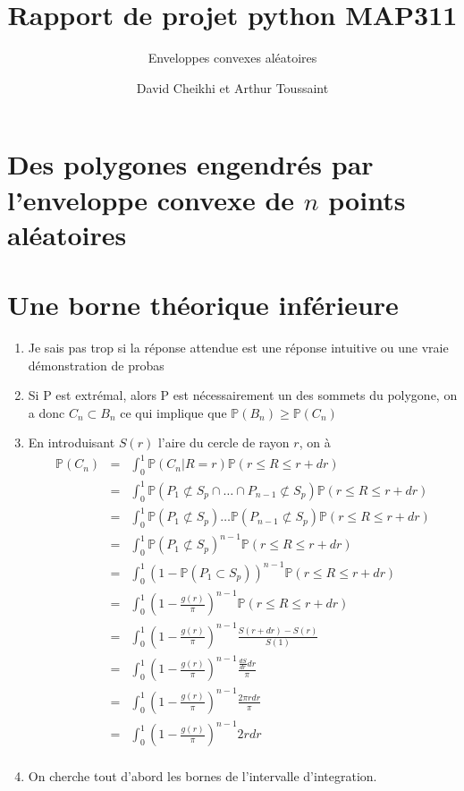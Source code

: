 \documentclass[a4paper,12pt,twoside]{article}
\title{Rapport de projet python MAP311}
\subtitle{Enveloppes convexes aléatoires}
\author{David Cheikhi et Arthur Toussaint}
\newcommand{\p}{\mathbb{P}}
\begin{document}
\maketitle

\section{Des polygones engendrés par l'enveloppe convexe de $n$ points aléatoires}
\section{Une borne théorique inférieure}
	\begin{enumerate}
		\item Je sais pas trop si la réponse attendue est une réponse intuitive ou une vraie démonstration de probas
		\item \label{extr} Si P est extrémal, alors P est nécessairement un des sommets du polygone, on a donc $C_n \subset B_n$ ce qui implique que $\p(B_n) \geq \p(C_n)$
		\item En introduisant $S(r)$ l'aire du cercle de rayon $r$, on à
		\begin{eqnarray}
			\p(C_n) &=& \int_0^1{\p(C_n | R = r) \p(r\leq R \leq r + dr)} \\
				&=& \int_0^1{\p(P_1 \not\subset S_p \cap \ldots \cap P_{n-1} \not\subset S_p)\p(r\leq R \leq r + dr)} \\
				&=& \int_0^1{\p(P_1 \not\subset S_p) \ldots \p(P_{n-1} \not\subset S_p)\p(r\leq R \leq r + dr)} \\
				&=& \int_0^1{\p(P_1 \not\subset S_p)^{n-1}\p(r\leq R \leq r + dr)} \\
				&=& \int_0^1{(1 - \p(P_1 \subset S_p))^{n-1}\p(r\leq R \leq r + dr)} \\
				&=& \int_0^1{\left( 1 - \frac{g(r)}{\pi}\right) ^{n-1}\p(r\leq R \leq r + dr)} \\
				&=& \int_0^1{\left( 1 - \frac{g(r)}{\pi}\right) ^{n-1}\frac{S(r + dr) - S(r)}{S(1)}} \\
				&=& \int_0^1{\left( 1 - \frac{g(r)}{\pi}\right) ^{n-1}\frac{\frac{dS}{dr}dr}{\pi}} \\
				&=& \int_0^1{\left( 1 - \frac{g(r)}{\pi}\right) ^{n-1}\frac{2\pi r dr}{\pi}} \\
				&=& \int_0^1{\left( 1 - \frac{g(r)}{\pi}\right) ^{n-1}2 r dr} \\
		\end{eqnarray}
		\item %
			On cherche tout d'abord les bornes de l'intervalle d'integration.


\end{enumerate}
\end{document}
